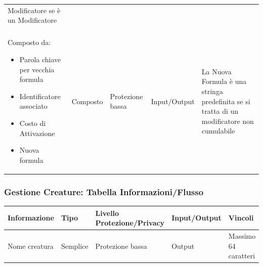 \documentclass[a4paper, 11pt]{article}
\let\newline\\
\begin{document}
\begin{adjustwidth}{-1.5cm}{-1.5cm}
\begin{center}
\begin{tabular}{|p{3cm}|p{1.5cm}|p{3.5cm}|p{2.5cm}|p{4cm}|}
        \hline
        Modificatore se è un Modificatore \newline \newline Composto da: 
        \begin{itemize}
            \item Parola chiave per vecchia formula 
            \item Identificatore associato 
            \item Costo di Attivazione 
            \item Nuova formula
        \end{itemize} & Composto & Protezione bassa & Input/Output & La Nuova Formula è una stringa predefinita se si tratta di un modificatore non cumulabile \\
        \hline
    \end{tabular}
\end{center}
\end{adjustwidth}


\vspace{2em}

\subsubsection*{Gestione Creature: Tabella Informazioni/Flusso}
\begin{adjustwidth}{-1.5cm}{-1.5cm}
\begin{center}
    \begin{tabular}{|p{3cm}|p{1.5cm}|p{3.5cm}|p{2.5cm}|p{4cm}|}
        \hline
        \textbf{Informazione} & \textbf{Tipo} & \textbf{Livello \newline Protezione/Privacy} & \textbf{Input/Output}&\textbf{Vincoli}\\
        \hline
        Nome creatura & Semplice & Protezione bassa & Output & Massimo 64 caratteri \\\hline
    \end{tabular}
\end{center}
\end{adjustwidth}
\end{document}
